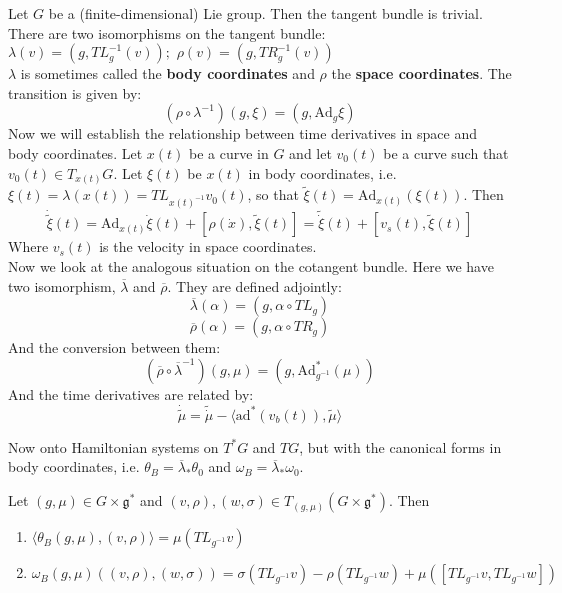 Let $G$ be a (finite-dimensional) Lie group. Then the tangent bundle is trivial. There are two isomorphisms on the tangent bundle:
$\lambda(v) = (g, TL^{-1}_g (v)); \hspace{4pt} \rho(v) = (g, TR^{-1}_g(v))$\\
\indent $\lambda$ is sometimes called the \textbf{body coordinates} and $\rho$ the \textbf{space coordinates}. The transition is given by:
\begin{equation}(\rho \circ \lambda^{-1})(g,\xi) = (g, \mathrm{Ad}_g \xi)\end{equation}
\indent Now we will establish the relationship between time derivatives in space and body coordinates. Let $x(t)$ be a curve in $G$ and let $v_0(t)$ be a curve such that $v_0(t) \in T_{x(t)}G$. Let $\xi(t)$ be $x(t)$ in body coordinates, i.e. $\xi(t) = \lambda(x(t)) = TL_{x(t)^{-1}} v_0(t)$, so that $\tilde{\xi}(t) = \mathrm{Ad}_{x(t)}(\xi(t))$. Then
\begin{equation}\dot{\tilde{\xi}}(t) = \mathrm{Ad}_{x(t)} \dot{\xi}(t) + [\rho(\dot{x}), \tilde{\xi}(t)] = \tilde{\dot{\xi}}(t) + [v_s(t), \tilde{\xi}(t)] \end{equation}
Where $v_s(t)$ is the velocity in space coordinates. \\
\indent Now we look at the analogous situation on the cotangent bundle. Here we have two isomorphism, $\overline{\lambda}$ and $\overline{\rho}$. They are defined adjointly:
\begin{equation}\overline{\lambda}(\alpha) = (g, \alpha \circ TL_g)\end{equation}
\begin{equation}\overline{\rho}(\alpha) = (g, \alpha \circ TR_g)\end{equation}
And the conversion between them:
\begin{equation} (\overline{\rho} \circ \overline{\lambda}^{-1})(g,\mu) = (g, \mathrm{Ad}^*_{g^{-1}}(\mu)) \end{equation}
And the time derivatives are related by:
\begin{equation}\dot{\tilde{\mu}} = \tilde{\dot{\mu}} - \langle \mathrm{ad}^*(v_b(t)), \tilde{\mu} \rangle\end{equation}

Now onto Hamiltonian systems on $T^*G$ and $TG$, but with the canonical forms in body coordinates, i.e. $\theta_B = \overline{\lambda}_* \theta_0$ and $ \omega_B = \overline{\lambda}_* \omega_0$.

\begin{prop}

Let $(g,\mu) \in G \times \mathfrak{g}^*$ and $(v,\rho),(w,\sigma) \in T_{(g,\mu)}(G \times \mathfrak{g}^*)$. Then
\begin{enumerate}
    \item $\langle \theta_B(g,\mu), (v,\rho) \rangle = \mu(TL_{g^{-1}} v)$
    \item $\omega_B(g,\mu)((v,\rho),(w, \sigma)) = \sigma(TL_{g^{-1}}v) - \rho(TL_{g^{-1}} w) + \mu( [TL_{g^{-1}} v, TL_{g^{-1}} w])$
\end{enumerate}
\end{prop}

